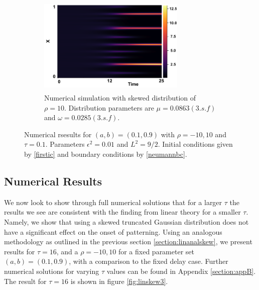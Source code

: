 \begin{figure}[H]
    \hfill
    \begin{subfigure}[t]{0.45\textwidth}
        \centering
        \includegraphics[width=7cm,height=4.75cm]{skew10.png}
        \caption{Numerical simulation with skewed distribution of $\rho=10$. Distribution parameters are $\mu=0.0863(3.s.f)$ and $\omega=0.0285(3.s.f)$.}
        \label{}
    \end{subfigure}
    \caption{Numerical rsesults for $(a,b)=(0.1,0.9)$ with $\rho=-10,10$ and $\tau=0.1$. Parameters $\epsilon^2=0.01$ and $L^2=9/2$. Initial conditions given by \eqref{firstic} and boundary conditions by \eqref{neumannbc}.}
    \label{fig:linskew1}
\end{figure}


\subsection{Numerical Results}

We now look to show through full numerical solutions that for a larger $\tau$ the results we see are consistent with the finding from linear theory for a smaller $\tau$. Namely, we show that using a skewed truncated Gaussian distribution does not have a significant effect on the onset of patterning. Using an analogous methodology as outlined in the previous section \ref{section:linanalskew}, we present results for $\tau=16$, and a $\rho=-10,10$ for a fixed parameter set $(a,b)=(0.1,0.9)$, with a comparison to the fixed delay case. Further numerical solutions for varying $\tau$ values can be found in Appendix \ref{section:appB}. The result for $\tau=16$ is shown in figure \ref{fig:linskew3}.


